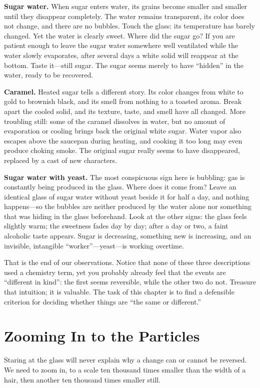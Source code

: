\textbf{Sugar water.} When sugar enters water, its grains become smaller and smaller until they disappear completely. The water remains transparent, its color does not change, and there are no bubbles. Touch the glass: its temperature has barely changed. Yet the water is clearly sweet. Where did the sugar go? If you are patient enough to leave the sugar water somewhere well ventilated while the water slowly evaporates, after several days a white solid will reappear at the bottom. Taste it---still sugar. The sugar seems merely to have ``hidden'' in the water, ready to be recovered.

\textbf{Caramel.} Heated sugar tells a different story. Its color changes from white to gold to brownish black, and its smell from nothing to a toasted aroma. Break apart the cooled solid, and its texture, taste, and smell have all changed. More troubling still: some of the caramel dissolves in water, but no amount of evaporation or cooling brings back the original white sugar. Water vapor also escapes above the saucepan during heating, and cooking it too long may even produce choking smoke. The original sugar really seems to have disappeared, replaced by a cast of new characters.

\textbf{Sugar water with yeast.} The most conspicuous sign here is bubbling: gas is constantly being produced in the glass. Where does it come from? Leave an identical glass of sugar water without yeast beside it for half a day, and nothing happens---so the bubbles are neither produced by the water alone nor something that was hiding in the glass beforehand. Look at the other signs: the glass feels slightly warm; the sweetness fades day by day; after a day or two, a faint alcoholic taste appears. Sugar is decreasing, something new is increasing, and an invisible, intangible ``worker''---yeast---is working overtime.

That is the end of our observations. Notice that none of these three descriptions used a chemistry term, yet you probably already feel that the events are ``different in kind'': the first seems reversible, while the other two do not. Treasure that intuition; it is valuable. The task of this chapter is to find a defensible criterion for deciding whether things are ``the same or different.''

\section{Zooming In to the Particles}

Staring at the glass will never explain why a change can or cannot be reversed. We need to zoom in, to a scale ten thousand times smaller than the width of a hair, then another ten thousand times smaller still.

